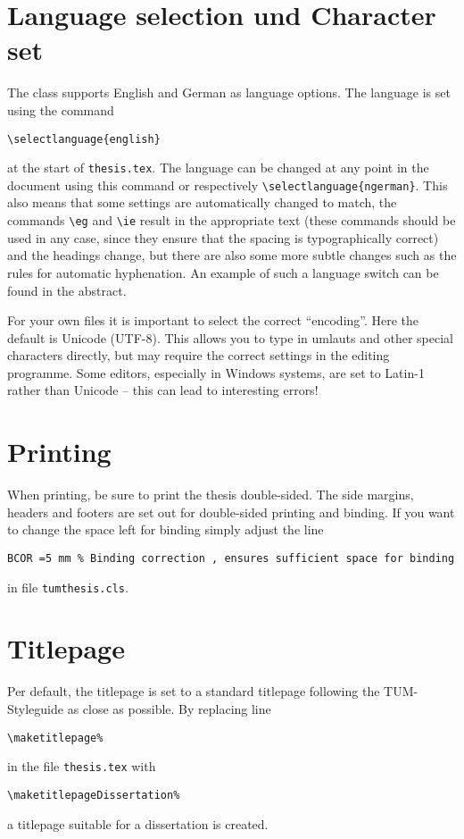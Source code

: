 \section{Language selection und Character set}
\label{sec:intro:language}
The class supports English and German as language options. The language is set using the command
\begin{lstlisting}[language={[LaTeX]TeX}]
  \selectlanguage{english}
\end{lstlisting}
at the start of \texttt{thesis.tex}. The language can be changed at any point in the document using this command or respectively \verb|\selectlanguage{ngerman}|. This also means that some settings are automatically changed to match, \eg the commands \verb|\eg| and \verb|\ie| result in the appropriate text (these commands should be used in any case, since they ensure that the spacing is typographically correct) and the headings change, but there are also some more subtle changes such as the rules for automatic hyphenation. An example of such a language switch can be found in the abstract.



For your own files it is important to select the correct \enquote{encoding}. Here the default is Unicode (UTF-8). This allows you to type in umlauts and other special characters directly, but may require the correct settings in the editing programme. Some editors, especially in Windows systems, are set to Latin-1 rather than Unicode -- this can lead to interesting errors!
\cite{KohmMorawski2012}

\section{Printing}
\label{sec:intro:binding}
When printing, be sure to print the thesis double-sided. The side margins, headers and footers are set out for double-sided printing and binding. If you want to change the space left for binding simply adjust the line
\begin{lstlisting}[language={[LaTeX]TeX}]
  BCOR =5 mm % Binding correction , ensures sufficient space for binding
\end{lstlisting}
in file \verb|tumthesis.cls|.

\section{Titlepage}
Per default, the titlepage is set to a standard titlepage following the TUM-Styleguide as close as possible. By replacing line
\begin{verbatim}
\maketitlepage%
\end{verbatim}
in the file \texttt{thesis.tex} with
\begin{verbatim}
\maketitlepageDissertation%
\end{verbatim}
a titlepage suitable for a dissertation is created.


